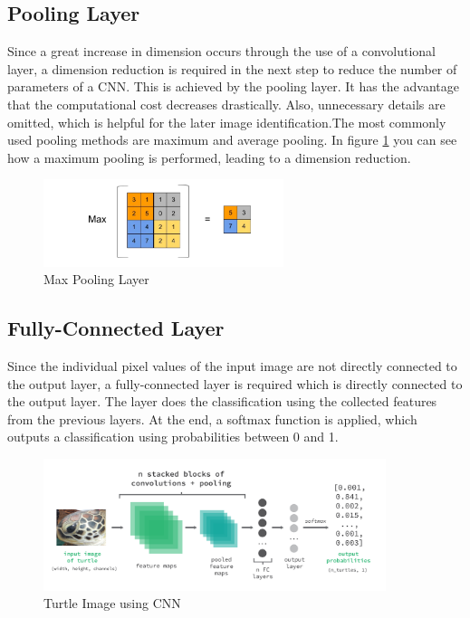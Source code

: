 \subsection{Pooling Layer}
Since a great increase in dimension occurs through the use of a convolutional layer, a dimension reduction is required in the next step to reduce the number of parameters of a CNN. This is achieved by the pooling layer. It has the advantage that the computational cost decreases drastically. Also, unnecessary details are omitted, which is helpful for the later image identification.The most commonly used pooling methods are maximum and average pooling. In figure \ref{fig:poolingLayer} you can see how a maximum pooling is performed, leading to a dimension reduction.

\begin{figure}[htb]
    \centering
    \includegraphics[width=7cm]{images/maxpooling.jpg}
    \caption{Max Pooling Layer}
    \label{fig:poolingLayer}
\end{figure}


\subsection{Fully-Connected Layer}
Since the individual pixel values of the input image are not directly connected to the output layer, a fully-connected layer is required which is directly connected to the output layer. The layer does the classification using the collected features from the previous layers. At the end, a softmax function is applied, which outputs a classification using probabilities between 0 and 1.

\begin{figure}[htb]
    \centering
    \includegraphics[width=10cm]{images/cnn_turtle_pooling.png}
    \caption{Turtle Image using CNN}
    \label{fig:turtleCNN}
\end{figure}